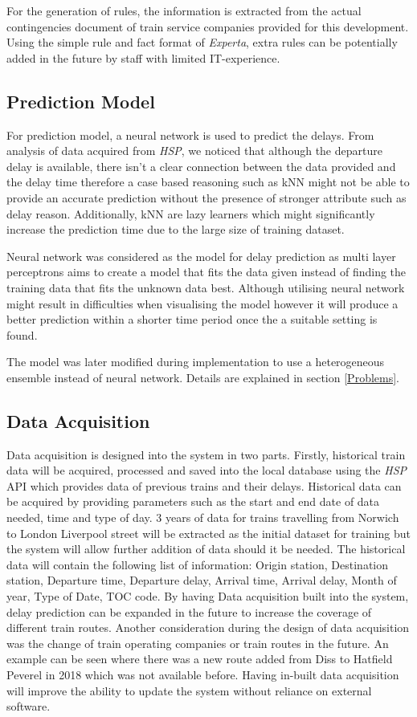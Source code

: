\documentclass[11pt]{article}
\begin{document}
For the generation of rules, the information is extracted from the actual contingencies document of train service companies provided for this development. Using the simple rule and fact format of \textit{Experta}, extra rules can be potentially added in the future by staff with limited IT-experience.

\subsection{Prediction Model}
For prediction model, a neural network is used to predict the delays. From analysis of data acquired from \textit{HSP}, we noticed that although the departure delay is available, there isn't a clear connection between the data provided and the delay time therefore a case based reasoning such as kNN might not be able to provide an accurate prediction without the presence of stronger attribute such as delay reason. Additionally, kNN are lazy learners which might significantly increase the prediction time due to the large size of training dataset.

Neural network was considered as the model for delay prediction as multi layer perceptrons aims to create a model that fits the data given instead of finding the training data that fits the unknown data best. Although utilising neural network might result in difficulties when visualising the model however it will produce a better prediction within a shorter time period once the a suitable setting is found.

The model was later modified during implementation to use a heterogeneous ensemble instead of neural network. Details are explained in section \ref{Problems}.

\subsection{Data Acquisition}
Data acquisition is designed into the system in two parts. Firstly, historical train data will be acquired, processed and saved into the local database using the \textit{HSP} API which provides data of previous trains and their delays. Historical data can be acquired by providing parameters such as the start and end date of data needed, time and type of day. 3 years of data for trains travelling from Norwich to London Liverpool street will be extracted as the initial dataset for training but the system will allow further addition of data should it be needed. The historical data will contain the following list of information: Origin station, Destination station, Departure time, Departure delay, Arrival time, Arrival delay, Month of year, Type of Date, TOC code. By having Data acquisition built into the system, delay prediction can be expanded in the future to increase the coverage of different train routes. Another consideration during the design of data acquisition was the change of train operating companies or train routes in the future. An example can be seen where there was a new route added from Diss to Hatfield Peverel in 2018 which was not available before. Having in-built data acquisition will improve the ability to update the system without reliance on external software.
\end{document}
